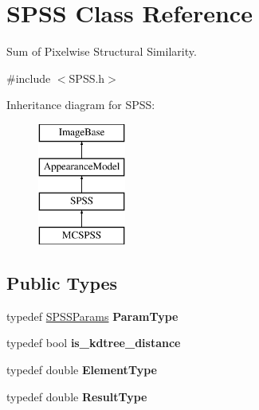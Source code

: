 \hypertarget{classSPSS}{\section{S\-P\-S\-S Class Reference}
\label{classSPSS}
}


Sum of Pixelwise Structural Similarity.  




{\ttfamily \#include $<$S\-P\-S\-S.\-h$>$}

Inheritance diagram for S\-P\-S\-S\-:\begin{figure}[H]
\begin{center}
\leavevmode
\includegraphics[height=4.000000cm]{classSPSS}
\end{center}
\end{figure}
\subsection*{Public Types}
\begin{DoxyCompactItemize}
\item 
\hypertarget{classSPSS_a63d3713a7b1d0d6b3a20b4a169da87be}{typedef \hyperlink{structSPSSParams}{S\-P\-S\-S\-Params} {\bfseries Param\-Type}}\label{classSPSS_a63d3713a7b1d0d6b3a20b4a169da87be}

\item 
\hypertarget{classSPSS_a17409d2e95f4e5735bb1b334f8015cd2}{typedef bool {\bfseries is\-\_\-kdtree\-\_\-distance}}\label{classSPSS_a17409d2e95f4e5735bb1b334f8015cd2}

\item 
\hypertarget{classSPSS_a6a64c9170c0f0e75c9fbf64d7a4f86c4}{typedef double {\bfseries Element\-Type}}\label{classSPSS_a6a64c9170c0f0e75c9fbf64d7a4f86c4}

\item 
\hypertarget{classSPSS_ad82c9d4534fbabd235195e0a04206eb8}{typedef double {\bfseries Result\-Type}}\label{classSPSS_ad82c9d4534fbabd235195e0a04206eb8}

\end{DoxyCompactItemize}

